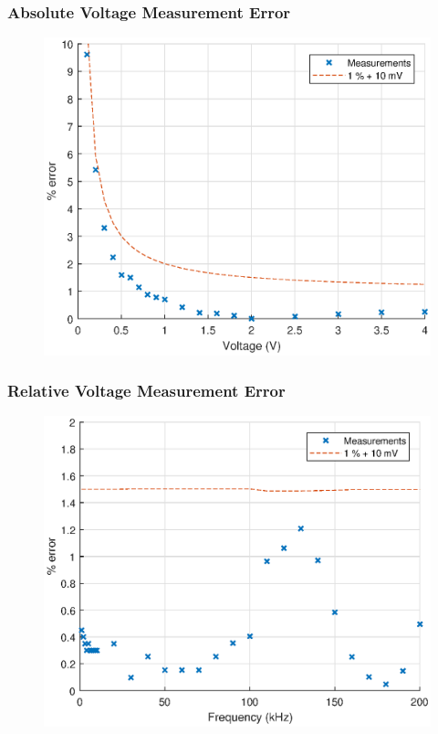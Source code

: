 \documentclass[pdf]{beamer}
\begin{document}
\begin{frame}
\frametitle{Absolute Voltage Measurement Error}
\begin{figure}[!htb]
  \includegraphics[height=0.8\textheight]{test-results/volt.eps}
\end{figure}
\end{frame}

\begin{frame}
\frametitle{Relative Voltage Measurement Error}
\begin{figure}[!htb]
  \includegraphics[height=0.8\textheight]{test-results/voltpp.eps}
\end{figure}
\end{frame}
\end{document}
